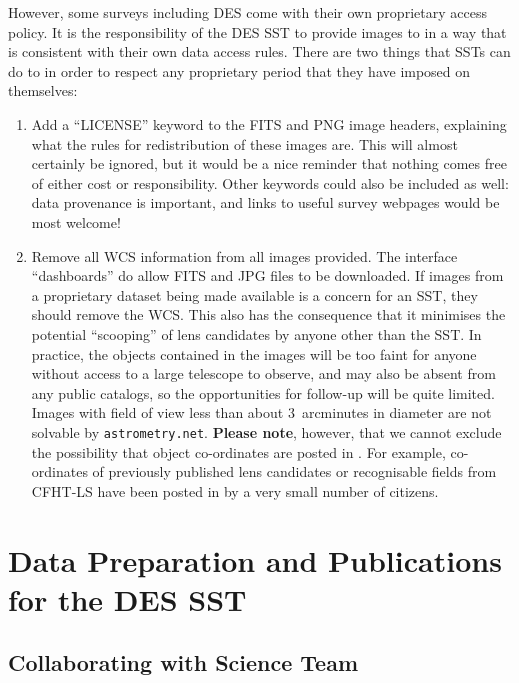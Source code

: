 \documentclass[a4paper,twocolumn]{article}
\begin{document}
However, some surveys including DES come with their own proprietary access policy. It is the responsibility
of the DES SST to provide images to \sw in a way that is consistent
with their own data access rules. There are two things that SSTs can
do to in order to respect any proprietary period that they have imposed on
themselves:
\begin{enumerate}

\item Add a ``LICENSE'' keyword to the FITS and PNG image headers, explaining
what the rules for redistribution of these images are. This will almost
certainly be ignored, but it would be a nice reminder that nothing comes free
of either cost or responsibility. Other keywords could also be included as
well: data provenance is important, and links to useful survey webpages would
be most welcome!

\item Remove all WCS information from all images provided. The \sw interface ``dashboards'' do allow FITS and JPG files to be downloaded. If images from a proprietary dataset being made available is a concern for an SST, they should remove the WCS. This also has the consequence that it minimises the potential ``scooping'' of  lens candidates by anyone other than the SST. 
In practice, the objects contained in the \sw images will be too faint
for anyone without access to a large telescope to observe, and may also be
absent from any public catalogs, so the opportunities for follow-up will be
quite limited. Images
with field of view less than about 3~arcminutes in diameter are not solvable
by \texttt{astrometry.net}. \textbf{Please note}, however, that we cannot exclude the possibility that object co-ordinates are posted in \Talk. For example, co-ordinates of previously published lens candidates or recognisable fields from CFHT-LS have been posted in \Talk by a very small number of citizens.

\end{enumerate}


\section{Data Preparation and Publications for the DES SST}
\label{sec:data}

\subsection{Collaborating with \sw Science Team}
\end{document}
